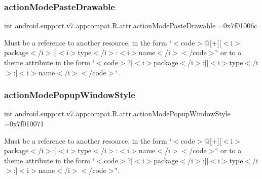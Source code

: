 \subsubsection{\texorpdfstring{action\+Mode\+Paste\+Drawable}{actionModePasteDrawable}}
{\footnotesize\ttfamily int android.\+support.\+v7.\+appcompat.\+R.\+attr.\+action\+Mode\+Paste\+Drawable =0x7f01006c\hspace{0.3cm}{\ttfamily [static]}}

Must be a reference to another resource, in the form \char`\"{}$<$code$>$@\mbox{[}+\mbox{]}\mbox{[}$<$i$>$package$<$/i$>$\+:\mbox{]}$<$i$>$type$<$/i$>$\+:$<$i$>$name$<$/i$>$$<$/code$>$\char`\"{} or to a theme attribute in the form \char`\"{}$<$code$>$?\mbox{[}$<$i$>$package$<$/i$>$\+:\mbox{]}\mbox{[}$<$i$>$type$<$/i$>$\+:\mbox{]}$<$i$>$name$<$/i$>$$<$/code$>$\char`\"{}. \mbox{\label{classandroid_1_1support_1_1v7_1_1appcompat_1_1R_1_1attr_a67a1d3ab65459d36fb09a31f7cc71c32}} 
\subsubsection{\texorpdfstring{action\+Mode\+Popup\+Window\+Style}{actionModePopupWindowStyle}}
{\footnotesize\ttfamily int android.\+support.\+v7.\+appcompat.\+R.\+attr.\+action\+Mode\+Popup\+Window\+Style =0x7f010071\hspace{0.3cm}{\ttfamily [static]}}

Must be a reference to another resource, in the form \char`\"{}$<$code$>$@\mbox{[}+\mbox{]}\mbox{[}$<$i$>$package$<$/i$>$\+:\mbox{]}$<$i$>$type$<$/i$>$\+:$<$i$>$name$<$/i$>$$<$/code$>$\char`\"{} or to a theme attribute in the form \char`\"{}$<$code$>$?\mbox{[}$<$i$>$package$<$/i$>$\+:\mbox{]}\mbox{[}$<$i$>$type$<$/i$>$\+:\mbox{]}$<$i$>$name$<$/i$>$$<$/code$>$\char`\"{}. \mbox{\label{classandroid_1_1support_1_1v7_1_1appcompat_1_1R_1_1attr_a31728190ee213b9e5ffbbe837b33f781}} 
